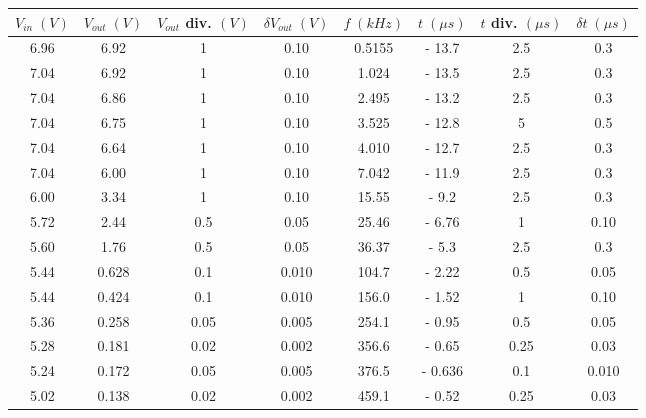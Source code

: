 \begin{tabular}{c|ccc|cccc}
\toprule
$V_{in} \; (V)$ & $V_{out} \; (V)$ & $V_{out}$ div. $(V)$ & $\delta V_{out} \; (V)$ & $f \; (kHz)$ & $t \; (\mu s)$ & $t$ div. $(\mu s)$ & $\delta t \; (\mu s)$ \\
\midrule
           6.96 &          6.92 &           1 &          0.10 &       0.5155 &          - 13.7 &          2.5 &       0.3 \\
           7.04 &          6.92 &           1 &          0.10 &        1.024 &          - 13.5 &          2.5 &       0.3 \\
           7.04 &          6.86 &           1 &          0.10 &        2.495 &          - 13.2 &          2.5 &       0.3 \\
           7.04 &          6.75 &           1 &          0.10 &        3.525 &          - 12.8 &            5 &       0.5 \\
           7.04 &          6.64 &           1 &          0.10 &        4.010 &          - 12.7 &          2.5 &       0.3 \\
           7.04 &          6.00 &           1 &          0.10 &        7.042 &          - 11.9 &          2.5 &       0.3 \\
           6.00 &          3.34 &           1 &          0.10 &        15.55 &          -  9.2 &          2.5 &       0.3 \\
           5.72 &          2.44 &         0.5 &          0.05 &        25.46 &          - 6.76 &            1 &      0.10 \\
           5.60 &          1.76 &         0.5 &          0.05 &        36.37 &          -  5.3 &          2.5 &       0.3 \\
           5.44 &         0.628 &         0.1 &         0.010 &        104.7 &          - 2.22 &          0.5 &      0.05 \\
           5.44 &         0.424 &         0.1 &         0.010 &        156.0 &          - 1.52 &            1 &      0.10 \\
           5.36 &         0.258 &        0.05 &         0.005 &        254.1 &          - 0.95 &          0.5 &      0.05 \\
           5.28 &         0.181 &        0.02 &         0.002 &        356.6 &          - 0.65 &         0.25 &      0.03 \\
           5.24 &         0.172 &        0.05 &         0.005 &        376.5 &          - 0.636 &         0.1 &      0.010 \\
           5.02 &         0.138 &        0.02 &         0.002 &        459.1 &          - 0.52 &         0.25 &      0.03 \\
\bottomrule
\end{tabular}
